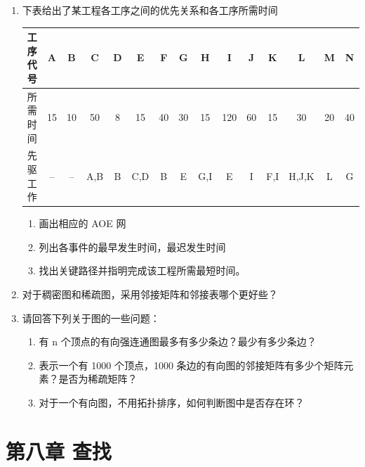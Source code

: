 \documentclass[12pt, a4paper]{article}
\begin{document}
\begin{enumerate}
    \item 下表给出了某工程各工序之间的优先关系和各工序所需时间
    \begin{center}
    \begin{tabular}{|c|c|c|c|c|c|c|c|c|c|c|c|c|c|c|}
    \hline
    工序代号 & A & B & C & D & E & F & G & H & I & J & K & L & M & N \\ \hline
    所需时间 & 15 & 10 & 50 & 8 & 15 & 40 & 30 & 15 & 120 & 60 & 15 & 30 & 20 & 40 \\ \hline
    先驱工作 & -- & -- & A,B & B & C,D & B & E & G,I & E & I & F,I & H,J,K & L & G \\ \hline
    \end{tabular}
    \end{center}
    \begin{enumerate}
        \item 画出相应的 AOE 网
        \item 列出各事件的最早发生时间，最迟发生时间
        \item 找出关键路径并指明完成该工程所需最短时间。
    \end{enumerate}
    
    \item 对于稠密图和稀疏图，采用邻接矩阵和邻接表哪个更好些？
    
    \item 请回答下列关于图的一些问题：
    \begin{enumerate}
        \item 有 n 个顶点的有向强连通图最多有多少条边？最少有多少条边？
        \item 表示一个有 1000 个顶点，1000 条边的有向图的邻接矩阵有多少个矩阵元素？是否为稀疏矩阵？
        \item 对于一个有向图，不用拓扑排序，如何判断图中是否存在环？
    \end{enumerate}
\end{enumerate}

\section{第八章 查找}
\end{document}

